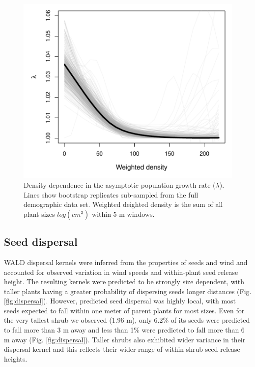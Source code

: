 \documentclass[11pt]{article}\usepackage[]{graphicx}\usepackage[usenames,dvipsnames]{xcolor}
\begin{document}
\begin{figure}[H]
  \begin{center}
    \includegraphics[width=\linewidth]{Figures/LambdaD}
  \caption{Density dependence in the asymptotic population growth rate ($\lambda$). Lines show bootstrap replicates sub-sampled from the full demographic data set. Weighted deighted density is the sum of all plant sizes $log(cm^3)$ within 5-m windows.}
  \label{fig:lambda}
  \end{center}
\end{figure}

\subsection*{Seed dispersal}
WALD dispersal kernels were inferred from the properties of seeds and wind and accounted for observed variation in wind speeds and within-plant seed release height.
The resulting kernels were predicted to be strongly size dependent, with taller plants having a greater probability of dispersing seeds longer distances (Fig. \ref{fig:dispersal}). 
However, predicted seed dispersal was highly local, with most seeds expected to fall within one meter of parent plants for most sizes. 
Even for the very tallest shrub we observed (1.96 m), only 6.2\% of its seeds were predicted to fall more than 3 m away and less than 1\% were predicted to fall more than 6 m away (Fig. \ref{fig:dispersal}). 
Taller shrubs also exhibited wider variance in their dispersal kernel and this reflects their wider range of within-shrub seed release heights. 
\end{document}
